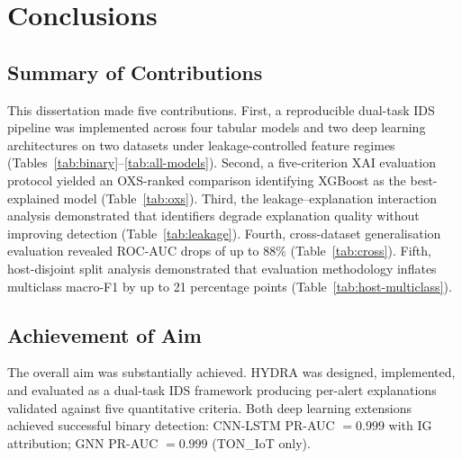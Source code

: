 \documentclass[12pt,a4paper]{report}
\begin{document}
\chapter{Conclusions}
\label{ch:conclusions}

\section{Summary of Contributions}
\label{sec:conclusion-contributions}

This dissertation made five contributions. First, a reproducible dual-task IDS pipeline was implemented across four tabular models and two deep learning architectures on two datasets under leakage-controlled feature regimes (Tables~\ref{tab:binary}--\ref{tab:all-models}). Second, a five-criterion XAI evaluation protocol yielded an OXS-ranked comparison identifying XGBoost as the best-explained model (Table~\ref{tab:oxs}). Third, the leakage--explanation interaction analysis demonstrated that identifiers degrade explanation quality without improving detection (Table~\ref{tab:leakage}). Fourth, cross-dataset generalisation evaluation revealed ROC-AUC drops of up to 88\% (Table~\ref{tab:cross}). Fifth, host-disjoint split analysis demonstrated that evaluation methodology inflates multiclass macro-F1 by up to 21 percentage points (Table~\ref{tab:host-multiclass}).

\section{Achievement of Aim}
\label{sec:achievement}

The overall aim was substantially achieved. HYDRA was designed, implemented, and evaluated as a dual-task IDS framework producing per-alert explanations validated against five quantitative criteria. Both deep learning extensions achieved successful binary detection: CNN-LSTM PR-AUC $= 0.999$ with IG attribution; GNN PR-AUC $= 0.999$ (TON\_IoT only).
\end{document}
